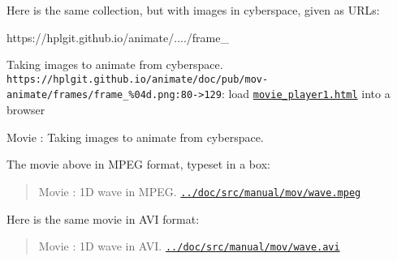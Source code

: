 \documentclass[%
oneside,                 %
final,                   %
10pt]{article}
\newenvironment{doconce:movie}{}{}
\newcounter{doconce:movie:counter}
\begin{document}
Here is the same collection, but with images in cyberspace, given as URLs:



\bdat
https://hplgit.github.io/animate/..../frame_%

\edat



\begin{doconce:movie}
\begin{center}
Taking images to animate from cyberspace. \Verb!https://hplgit.github.io/animate/doc/pub/mov-animate/frames/frame_%
\end{center}

\begin{center}  %
Movie : Taking images to animate from cyberspace.
\end{center}
\end{doconce:movie}


The movie above in MPEG format, typeset in a box:


\begin{center}
\begin{Sbox}
\begin{minipage}{0.85\linewidth}

\begin{doconce:movie}
\begin{quote}
Movie : 1D wave in MPEG. \label{mov:wave} \href{run:../doc/src/manual/mov/wave.mpeg}{\nolinkurl{../doc/src/manual/mov/wave.mpeg}}
\end{quote}
\end{doconce:movie}
\end{minipage}
\end{Sbox}
\fbox{\TheSbox}
\end{center}

Here is the same movie in AVI format:


\begin{doconce:movie}
\begin{quote}
Movie : 1D wave in AVI. \href{run:../doc/src/manual/mov/wave.avi}{\nolinkurl{../doc/src/manual/mov/wave.avi}}
\end{quote}
\end{doconce:movie}
\end{document}
